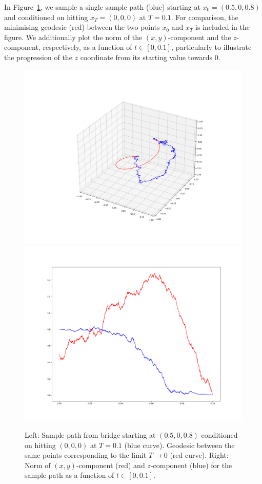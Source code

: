 \documentclass[10pt]{amsart}
\theoremstyle{remark}
\numberwithin{equation}{section}
\begin{document}
In Figure~\ref{fig:bridge_sample}, we sample a single sample path (blue) starting at $x_0=(0.5,0,0.8)$ and conditioned on hitting $x_T=(0,0,0)$ at $T=0.1$. For comparison, the minimising geodesic (red) between the two points $x_0$ and $x_T$ is included in the figure. We additionally plot the norm of the $(x,y)$-component and the $z$-component, respectively, as a function of $t\in[0,0.1]$, particularly to illustrate the progression of the $z$ coordinate from its starting value towards $0$.
\begin{figure}[ht]
\centering
\includegraphics[width=.48\linewidth,trim=100 25 100 100,clip]{figures/guided.png}
\hfill %
\includegraphics[width=.48\linewidth,trim=100 25 100 100,clip]{figures/guided_norms.png}
\caption{Left: Sample path from bridge starting at $(0.5,0,0.8)$ conditioned on hitting $(0,0,0)$ at $T=0.1$ (blue curve). Geodesic between the same points corresponding to the limit $T\to 0$ (red curve). Right: Norm of $(x,y)$-component (red) and $z$-component (blue) for the sample path as a function of $t\in[0,0.1]$.}
\label{fig:bridge_sample}
\end{figure}
\end{document}
